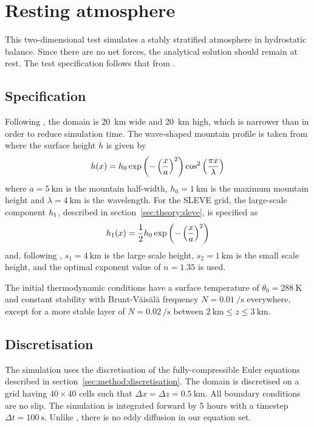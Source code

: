 \section{Resting atmosphere}
\label{sec:resting}

This two-dimensional test simulates a stably stratified atmosphere in hydrostatic balance.  Since there are no net forces, the analytical solution should remain at rest.  The test specification follows that from \textcite{klemp2011}.  

\subsection{Specification}
Following \textcite{weller-shahrokhi2014}, the domain is \SI{20}{\kilo\meter} wide and \SI{20}{\kilo\meter} high, which is narrower than \textcite{klemp2011} in order to reduce simulation time.  The wave-shaped mountain profile is taken from \textcite{schaer2002} where the surface height $h$ is given by
\begin{align}
h(x) = h_0 \exp \left( - \left( \frac{x}{a} \right)^2 \right) \cos^2 \left( \frac{\pi x}{\lambda} \right)
\end{align}
where $a = \SI{5}{\kilo\meter}$ is the mountain half-width, $h_0 = \SI{1}{\kilo\meter}$ is the maximum mountain height and $\lambda = \SI{4}{\kilo\meter}$ is the wavelength.  For the SLEVE grid, the large-scale component $h_1$, described in section~\ref{sec:theory:sleve}, is specified as
\begin{align}
h_1(x) = \frac{1}{2} h_0 \exp \left( - \left( \frac{x}{a} \right)^2 \right)
\end{align}
and, following \cite{leuenberger2010}, $s_1 = \SI{4}{\kilo\meter}$ is the large scale height, $s_2 = \SI{1}{\kilo\meter}$ is the small scale height, and the optimal exponent value of $n = 1.35$ is used.

The initial thermodynamic conditions have a surface temperature of $\theta_0 = \SI{288}{\kelvin}$ and constant stability with Brunt-V\"ais\"al\"a frequency $N = \SI{0.01}{\per\second}$ everywhere, except for a more stable layer of $N = \SI{0.02}{\per\second}$ between $\SI{2}{\kilo\meter} \leq z \leq \SI{3}{\kilo\meter}$.

\subsection{Discretisation}
The simulation uses the discretisation of the fully-compressible Euler equations described in section~\ref{sec:method:discretisation}.  The domain is discretised on a grid having $40 \times 40$ cells such that $\Delta x = \Delta z = \SI{0.5}{\kilo\meter}$.  All boundary conditions are no slip.  The simulation is integrated forward by 5 hours with a timestep $\Delta t = \SI{100}{\second}$.  Unlike \textcite{klemp2011}, there is no eddy diffusion in our equation set.

